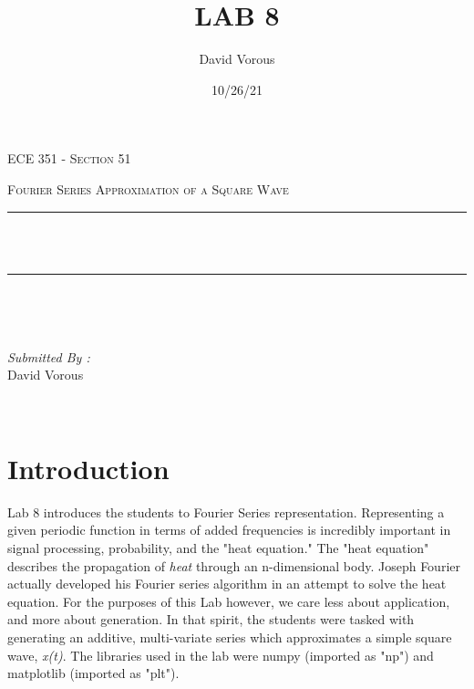 \documentclass[12pt]{report}
\title{LAB 8}
\author{ David Vorous}
\date{10/26/21}
\makeatletter
\let\thetitle\@title
\makeatother
\begin{document}
\begin{titlepage}
	\centering
    \vspace*{0.5 cm}
\begin{center}    \textsc{\Large   ECE 351 - Section 51 }\\[2.0 cm]	\end{center}
	\textsc{\Large Fourier Series Approximation of a Square Wave }\\[0.5 cm]
	\rule{\linewidth}{0.2 mm} \\[0.4 cm]
	{ \huge \bfseries \thetitle}\\
	\rule{\linewidth}{0.2 mm} \\[1.5 cm]
	
	\begin{minipage}{0.4\textwidth}
		\begin{flushleft} \large
			\end{flushleft}
			\end{minipage}~
			\begin{minipage}{0.4\textwidth}
            
			\begin{flushright} \large
			\emph{Submitted By :} \\
			David Vorous  
		\end{flushright}
           
	\end{minipage}\\[2 cm]

\end{titlepage}


\tableofcontents

\pagebreak

\renewcommand{\thesection}{\arabic{section}}

\section{Introduction}

Lab 8 introduces the students to Fourier Series representation. Representing a given periodic function in terms of added frequencies is incredibly important in signal processing, probability, and the "heat equation." The "heat equation" describes the propagation of \textit{heat} through an n-dimensional body. Joseph Fourier actually developed his Fourier series algorithm in an attempt to solve the heat equation. For the purposes of this Lab however, we care less about application, and more about generation. In that spirit, the students were tasked with generating an additive, multi-variate series which approximates a simple square wave, \textit{x(t)}. The libraries used in the lab were numpy (imported as "np") and matplotlib (imported as "plt").
\end{document}
